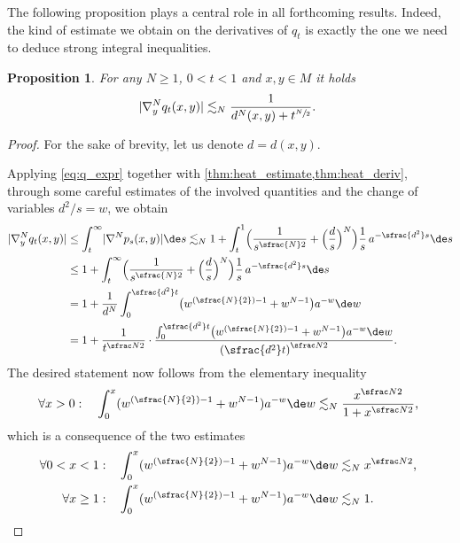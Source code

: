 \documentclass[JEP,XML,SOM,Unicode]{cedram}
\newcommand{\Psfrac}[2]{(\sfrac{#1}{#2})}
\newcounter{results}[section]
\theoremstyle{plain}
\newtheorem{proposition}[results]{Proposition}
\theoremstyle{definition}
\numberwithin{equation}{section}
\renewcommand{\comma}{\ensuremath{\text{, }}}
\newcommand{\comma}{\ensuremath{\text{, }}}
\newcommand{\fullstop}{\ensuremath{\text{. }}}
\DeclarePairedDelimiter\abs{\lvert}{\rvert}
\begin{document}
The following proposition plays a central role in all forthcoming results. Indeed, the kind of
estimate we obtain on the derivatives of $q_t$ is exactly the one we need to deduce strong
integral inequalities.
\begin{proposition}\label{prop:q_deriv}
For any $N\ge 1$, $0<t<1$ and $x,y\in M$ it holds
\begin{equation*}
\abs{\nabla^N_y q_t(x,y)} \lesssim_N \frac{1}{d^N(x,y)+t^{\sfrac N2}} \fullstop
\end{equation*}
\end{proposition}
\begin{proof}
For the sake of brevity, let us denote $d=d(x,y)$.

Applying \cref{eq:q_expr} together with \cref{thm:heat_estimate,thm:heat_deriv}, through some
careful estimates of the involved quantities and the change of variables $d^2/s=w$, we obtain
\begin{align*}
\abs{\nabla^N_y q_t(x,y)}
&\le \int_t^{\infty} \abs{\nabla^N p_s(x,y)}\de s
\lesssim_N 1 + \int_t^1\Bigl(\frac{1}{s^{\sfrac{N}2}}
+ \Bigl(\frac ds\Bigr)^N\Bigr)\frac 1s\, a^{-\sfrac{d^2}s}\de s \\
&\le 1 + \int_t^\infty\Bigl(\frac{1}{s^{\sfrac{N}2}}
+ \Bigl(\frac ds\Bigr)^N\Bigr)\frac 1s\, a^{-\sfrac{d^2}s}\de s \\
&= 1 + \frac 1{d^N}\int_0^{\sfrac{d^2}t}\bigl(w^{\Psfrac N2-1}+w^{N-1}\bigr)a^{-w}\de w \\
&= 1 + \frac 1{t^{\sfrac N2}}\cdot
\frac{\int_0^{\sfrac{d^2}t}\bigl(w^{\Psfrac N2-1}+w^{N-1}\bigr)a^{-w}\de w}
{\left(\sfrac{d^2}t\right)^{\sfrac N2}} \fullstop
\end{align*}
The desired statement now follows from the elementary inequality
\begin{equation*}
\forall x > 0:\quad \int_0^x (w^{\Psfrac N2-1} + w^{N-1})a^{-w}\de w \lesssim_N \frac{x^{\sfrac N2}}{1+x^{\sfrac N2}} \comma
\end{equation*}
which is a consequence of the two estimates
\begin{align*}
\forall 0 < x < 1:\quad &\int_0^x (w^{\Psfrac N2-1} + w^{N-1})a^{-w}\de w \lesssim_N x^{\sfrac N2} \comma\\
\forall x \ge 1:\quad &\int_0^x (w^{\Psfrac N2-1} + w^{N-1})a^{-w}\de w \lesssim_N 1 \fullstop\qedhere
\end{align*}
\end{proof}
\end{document}
